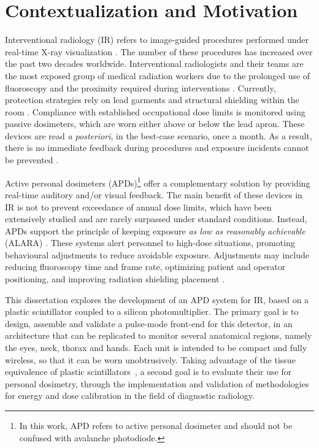 \chapter*{Contextualization and Motivation}
Interventional radiology (IR) refers to image-guided procedures
performed under real-time X-ray visualization \cite{6}. The number of these procedures has
increased over the past two decades worldwide. Interventional radiologists
and their teams are the most exposed group of medical radiation workers due to the prolonged
use of fluoroscopy and the proximity required during interventions \cite{10,55}.
Currently, protection strategies rely on lead garments
and structural shielding within the room \cite{37}. Compliance with established occupational dose limits is monitored
using passive dosimeters, which are worn either above or below the lead apron. These devices
are read \emph{a posteriori}, in the best-case scenario, once a month. As a result, there is no
immediate feedback during procedures and exposure incidents cannot be prevented \cite{46,67}.

Active personal dosimeters (APDs)\footnote{In this work, APD refers to active
personal dosimeter and should not be confused with avalanche photodiode.}
offer a complementary solution by providing real-time auditory and/or visual feedback. The main benefit
of these devices in IR is not to prevent exceedance of annual dose limits, which have been extensively studied and are rarely
surpassed under standard conditions. Instead, APDs support
the principle of keeping exposure {\it as low as reasonably achievable }(ALARA) \cite{1,2,3}. These systems alert personnel to high-dose situations, promoting behavioural adjustments to reduce avoidable exposure. Adjustments may include reducing fluoroscopy time and frame rate, optimizing patient and operator positioning, and improving radiation shielding placement \cite{4}.

This dissertation explores the development of an APD system for IR, based on a plastic
scintillator coupled to a silicon photomultiplier. The primary goal is to design,
assemble and validate a pulse-mode front-end for this detector, in an architecture that can
be replicated to monitor several anatomical regions, namely the eyes, neck, thorax and
hands. Each unit is intended to be compact and fully wireless, so that it can be worn
unobtrusively. Taking advantage of the tissue equivalence of plastic scintillators~\cite{129}, a second
goal is to evaluate their use for personal dosimetry, through the implementation and validation
of methodologies for energy and dose calibration in the field of diagnostic radiology.

